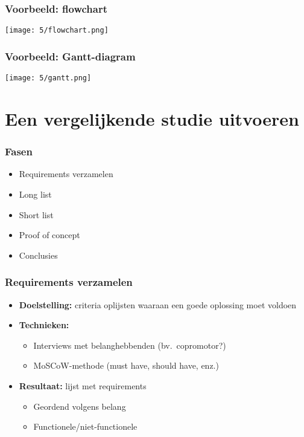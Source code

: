\documentclass[aspectratio=169]{beamer}
\begin{document}
\begin{frame}
  \frametitle{Voorbeeld: flowchart}

  \centering
  \texttt{[image: 5/flowchart.png]}
\end{frame}

\begin{frame}
  \frametitle{Voorbeeld: Gantt-diagram}

  \centering
  \texttt{[image: 5/gantt.png]}
\end{frame}

\section{Een vergelijkende studie uitvoeren}

\begin{frame}
  \frametitle{Fasen}


  \begin{itemize}
    \item Requirements verzamelen
    \item Long list
    \item Short list
    \item Proof of concept
    \item Conclusies
  \end{itemize}

\end{frame}

\begin{frame}
  \frametitle{Requirements verzamelen}

  \begin{itemize}
    \item \textbf{Doelstelling:} criteria oplijsten waaraan een goede oplossing moet voldoen
    \item \textbf{Technieken:}
          \begin{itemize}
            \item Interviews met belanghebbenden (bv.\ copromotor?)
            \item MoSCoW-methode (must have, should have, enz.)
          \end{itemize}
    \item \textbf{Resultaat:} lijst met requirements
          \begin{itemize}
            \item Geordend volgens belang
            \item Functionele/niet-functionele
          \end{itemize}
  \end{itemize}

\end{frame}
\end{document}
